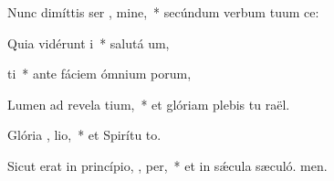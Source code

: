 \item Nunc dimíttis ser , mine,~* secúndum verbum tuum  ce:
\item Quia vidérunt  i~* salutá um,
\item {} ti~* ante fáciem ómnium porum,
\item Lumen ad revela tium,~* et glóriam plebis tu raël.
\item Glória ,  lio,~* et Spirítu to.
\item Sicut erat in princípio,  ,  per,~* et in sǽcula sæculó. men.
